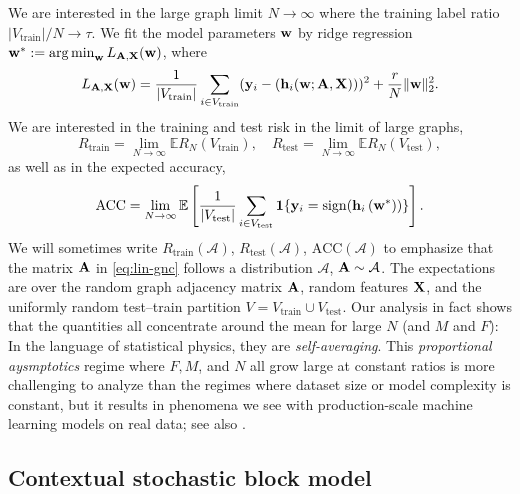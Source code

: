 \documentclass[9pt,twocolumn]{pnas-new}
\newcommand{\idd}[1]{{#1}}
\begin{document}
We are interested in the large graph limit $N \to \infty$ where the training label ratio $|V_{\text{train}}|  / N \to \tau$. We fit the model parameters $\mathbf{w}$ by ridge regression $\mathbf{w}^* := \operatorname*{arg\,min}_{\mathbf{w}}  L_{\mathbf{A},\mathbf{X}}(\mathbf{w})$, where 
\begin{equation}\label{eqn: optim}
L_{\mathbf{A},\mathbf{X}}(\mathbf{w})=\frac{1}{|V_{\text{train}}|}\sum_{i \in V_\text{train}} (\mathbf{y}_i-\left(\mathbf{h}_i(\mathbf{w};\mathbf{A},\mathbf{X})\right))^2+ \frac{r}{N} \|\mathbf{w}\|^2_2.
\end{equation}
We are interested in the training and test risk in the limit of large graphs,
\begin{equation}\label{eqn: risk}
    R_{\mathrm{train}} = \lim_{N \to \infty} \mathbb{E} R_N(V_{\mathrm{train}}),
    \quad    R_{\mathrm{test}} = \lim_{N \to \infty} \mathbb{E} R_N(V_{\mathrm{test}}),
\end{equation}
%
as well as in the expected accuracy, 
%
\begin{equation}\label{eqn: ACC}
    \mathrm{ACC}
    =
    \lim_{N \to \infty} \mathbb{E} 
    \left[\frac{1}{|V_{\text{test}}|}
    \sum_{i\in V_\text{test}} \mathbf{1}\{ \mathbf{y}_i=\mathrm{sign}(\mathbf{h}_i\left(\mathbf{w}^*\right))\} \right].
\end{equation}
We will sometimes write $R_\mathrm{train}(\mathcal{A})$, $R_\mathrm{test}(\mathcal{A})$, $\mathrm{ACC}(\mathcal{A})$ to emphasize that the matrix $\mathbf{A}$ in \eqref{eq:lin-gnc} follows a distribution $\mathcal{A}$, $\mathbf{A} \sim \mathcal{A}$. The expectations are over the random graph adjacency matrix $\mathbf{A}$, random features $\mathbf{X}$, and the uniformly random test--train partition $V = V_\mathrm{train} \cup V_\mathrm{test}$. Our analysis in fact shows that the quantities all concentrate around the mean for large $N$ (and $M$ and $F$): In the language of statistical physics, they are \emph{self-averaging}. \idd{This \emph{proportional aysmptotics} regime where $F, M$, and $N$ all grow large at constant ratios is more challenging to analyze than the regimes where dataset size or model complexity is constant, but it results in phenomena we see with production-scale machine learning models on real data; see also \cite{martin2017rethinking,liao2020random}.}


\subsection*{Contextual stochastic block model}
\end{document}
